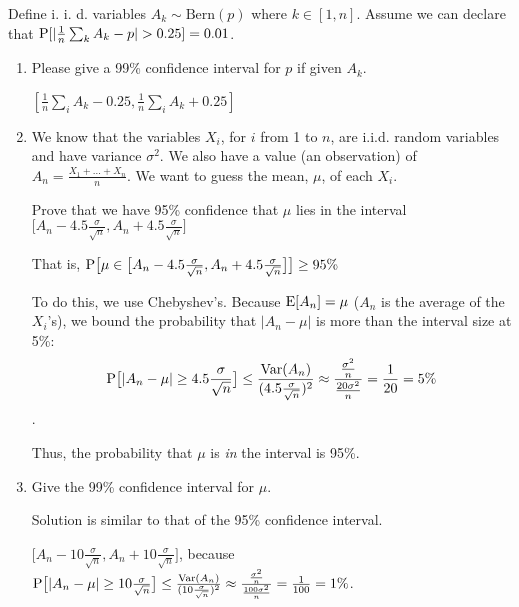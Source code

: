\question Define i. i. d. variables ${A_k}\sim \text{Bern}(p)$ where 
$k \in [1, n]$. Assume we can declare that $\P[|\frac{1}{n}\sum_{k} 
A_k - p| > 0.25] = 0.01$.
\begin{enumerate}[label=(\alph*)]
\item  Please give a 99\% confidence interval  for $p$ if given $A_k$.
\begin{solution}[3cm]
$[\frac{1}{n} \sum_{i} A_k - 0.25, \frac{1}{n} \sum_{i} A_k + 0.25]$
\end{solution}

\item We know that the variables $X_i$, for $i$ from 1 to $n$, are i.i.d. 
random variables and have variance $\sigma^2$. We also have a value (an observation) 
of $A_n = \frac{X_1 + \ldots + X_n}{n}$. We want to guess the mean, $\mu$, 
of each $X_i$.

Prove that we have 95\% confidence that $\mu$ lies in the interval
$\big[ A_n - 4.5\frac{\sigma}{\sqrt{n}}, A_n + 4.5\frac{\sigma}{\sqrt{n}} \big]$

That is,
$\P \big[ \mu \in \big[ A_n - 4.5\frac{\sigma}{\sqrt{n}}, A_n + 
4.5\frac{\sigma}{\sqrt{n}} \big] \big] \ge 95\%$
\begin{solution} [3cm]
To do this, we use Chebyshev's. Because $\E[A_n] = \mu$ ($A_n$  is the 
average of the $X_i$’s), we bound the probability that $|A_n - \mu|$ 
is more than the interval size at 5\%:\newline
\[\P\big[ |A_n - \mu| \ge 4.5\frac{\sigma}{\sqrt{n}} \big] \le 
\frac{\text{Var}(A_n)}{(4.5 \frac{\sigma}{\sqrt{n}})^2} \approx 
\frac{\frac{\sigma^2}{n}}{\frac{20\sigma^2}{n}} = \frac{1}{20} = 5\%\].

Thus, the probability that $\mu$ is \textit{in} the interval is 95\%.
\end{solution}

\item Give the 99\% confidence interval for $\mu$.
\begin{solution}[3cm]
Solution is similar to that of the 95\% confidence interval. 

$\big[ A_n - 10\frac{\sigma}{\sqrt{n}}, A_n + 10\frac{\sigma}{\sqrt{n}} 
\big]$, because
$\P\big[ |A_n - \mu| \ge 10\frac{\sigma}{\sqrt{n}} \big] \le 
\frac{\text{Var}(A_n)}{(10 \frac{\sigma}{\sqrt{n}})^2} \approx 
\frac{\frac{\sigma^2}{n}}{\frac{100\sigma^2}{n}} = \frac{1}{100} = 1\%$.
\end{solution}
\end{enumerate}